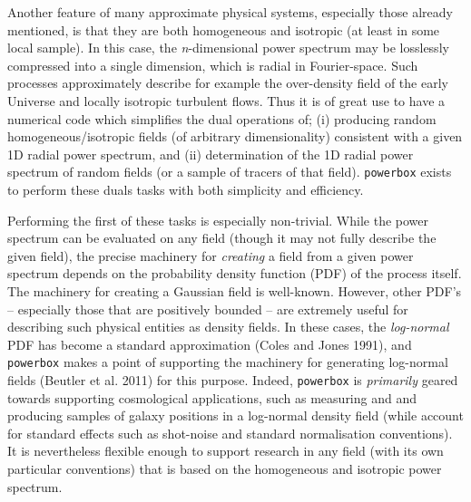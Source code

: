 \documentclass[10pt,a4paper,onecolumn]{article}
\begin{document}
Another feature of many approximate physical systems, especially those
already mentioned, is that they are both homogeneous and isotropic (at
least in some local sample). In this case, the \emph{n}-dimensional
power spectrum may be losslessly compressed into a single dimension,
which is radial in Fourier-space. Such processes approximately describe
for example the over-density field of the early Universe and locally
isotropic turbulent flows. Thus it is of great use to have a numerical
code which simplifies the dual operations of; (i) producing random
homogeneous/isotropic fields (of arbitrary dimensionality) consistent
with a given 1D radial power spectrum, and (ii) determination of the 1D
radial power spectrum of random fields (or a sample of tracers of that
field). \texttt{powerbox} exists to perform these duals tasks with both
simplicity and efficiency.

Performing the first of these tasks is especially non-trivial. While the
power spectrum can be evaluated on any field (though it may not fully
describe the given field), the precise machinery for \emph{creating} a
field from a given power spectrum depends on the probability density
function (PDF) of the process itself. The machinery for creating a
Gaussian field is well-known. However, other PDF's -- especially those
that are positively bounded -- are extremely useful for describing such
physical entities as density fields. In these cases, the
\emph{log-normal} PDF has become a standard approximation (Coles and
Jones 1991), and \texttt{powerbox} makes a point of supporting the
machinery for generating log-normal fields (Beutler et al. 2011) for
this purpose. Indeed, \texttt{powerbox} is \emph{primarily} geared
towards supporting cosmological applications, such as measuring and and
producing samples of galaxy positions in a log-normal density field
(while account for standard effects such as shot-noise and standard
normalisation conventions). It is nevertheless flexible enough to
support research in any field (with its own particular conventions) that
is based on the homogeneous and isotropic power spectrum.
\end{document}
